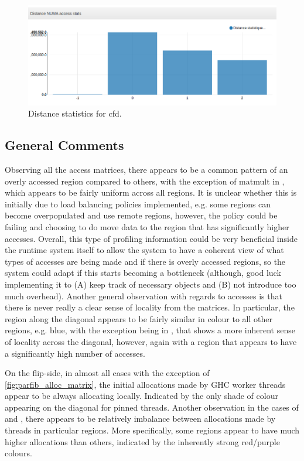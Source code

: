 \documentclass[a4paper,11pt]{article}
\begin{document}
\begin{figure}[!htb]
    \centering
    \includegraphics[width=\linewidth]{TechMemo/results/prsa/prsa_distance.png}
    \caption{Distance statistics for cfd.}
    \label{fig:cfd_distance}
\end{figure}

\subsection{General Comments}

Observing all the access matrices, there appears to be a common pattern of an overly accessed region compared to others, with the exception of matmult in , which appears to be fairly uniform across all regions. It is unclear whether this is initially due to load balancing policies implemented, e.g. some regions can become overpopulated and use remote regions, however, the policy could be failing and choosing to do move data to the region that has significantly higher accesses. Overall, this type of profiling information could be very beneficial inside the runtime system itself to allow the system to have a coherent view of what types of accesses are being made and if there is overly accessed regions, so the system could adapt if this starts becoming a bottleneck (although, good luck implementing it to (A) keep track of necessary objects and (B) not introduce too much overhead). Another general observation with regards to accesses is that there is never really a clear sense of locality from the matrices. In particular, the region along the diagonal appears to be fairly similar in colour to all other regions, e.g. blue, with the exception being in , that shows a more inherent sense of locality across the diagonal, however, again with a region that appears to have a significantly high number of accesses.

On the flip-side, in almost all cases with the exception of \cref{fig:parfib_alloc_matrix}, the initial allocations made by GHC worker threads appear to be always allocating locally. Indicated by the only shade of colour appearing on the diagonal for pinned threads. Another observation in the cases of  and , there appears to be relatively imbalance between allocations made by threads in particular regions. More specifically, some regions appear to have much higher allocations than others, indicated by the inherently strong red/purple colours.
\end{document}
